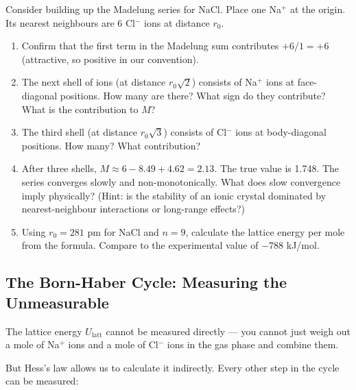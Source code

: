 \documentclass[12pt, a4paper]{book}
\begin{document}
\begin{puzzlebox}
Consider building up the Madelung series for NaCl.
Place one Na$^+$ at the origin.
Its nearest neighbours are 6 Cl$^-$ ions at distance $r_0$.

\begin{enumerate}[label=(\alph*), leftmargin=*]
  \item Confirm that the first term in the Madelung sum
        contributes $+6/1 = +6$ (attractive, so positive
        in our convention).

  \item The next shell of ions (at distance $r_0\sqrt{2}$)
        consists of Na$^+$ ions at face-diagonal positions.
        How many are there? What sign do they contribute?
        What is the contribution to $M$?

  \item The third shell (at distance $r_0\sqrt{3}$) consists
        of Cl$^-$ ions at body-diagonal positions.
        How many? What contribution?

  \item After three shells, $M \approx 6 - 8.49 + 4.62 = 2.13$.
        The true value is 1.748.
        The series converges slowly and non-monotonically.
        What does slow convergence imply physically?
        (Hint: is the stability of an ionic crystal dominated
        by nearest-neighbour interactions or long-range effects?)

  \item Using $r_0 = 281$ pm for NaCl and $n = 9$,
        calculate the lattice energy per mole from the formula.
        Compare to the experimental value of $-788$ kJ/mol.
\end{enumerate}
\end{puzzlebox}

\subsection{The Born-Haber Cycle: Measuring the Unmeasurable}

The lattice energy $U_\text{latt}$ cannot be measured directly ---
you cannot just weigh out a mole of Na$^+$ ions and a mole
of Cl$^-$ ions in the gas phase and combine them.

But Hess's law allows us to calculate it indirectly.
Every other step in the cycle can be measured:
\end{document}
